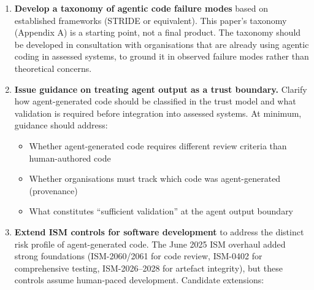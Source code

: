 \documentclass[a4paper,11pt]{report}
\providecommand{\tightlist}{%
  \setlength{\itemsep}{0pt}\setlength{\parskip}{0pt}}
\begin{document}
\begin{enumerate}
\def\labelenumi{\arabic{enumi}.}
\item
  \textbf{Develop a taxonomy of agentic code failure modes} based on
  established frameworks (STRIDE or equivalent). This paper's taxonomy
  (Appendix A) is a starting point, not a final product. The taxonomy
  should be developed in consultation with organisations that are
  already using agentic coding in assessed systems, to ground it in
  observed failure modes rather than theoretical concerns.
\item
  \textbf{Issue guidance on treating agent output as a trust boundary.}
  Clarify how agent-generated code should be classified in the trust
  model and what validation is required before integration into assessed
  systems. At minimum, guidance should address:

  \begin{itemize}
  \tightlist
  \item
    Whether agent-generated code requires different review criteria than
    human-authored code
  \item
    Whether organisations must track which code was agent-generated
    (provenance)
  \item
    What constitutes ``sufficient validation'' at the agent output
    boundary
  \end{itemize}
\item
  \textbf{Extend ISM controls for software development} to address the
  distinct risk profile of agent-generated code. The June 2025 ISM
  overhaul added strong foundations (ISM-2060/2061 for code review,
  ISM-0402 for comprehensive testing, ISM-2026--2028 for artefact
  integrity), but these controls assume human-paced development.
  Candidate extensions:


\end{enumerate}
\end{document}
